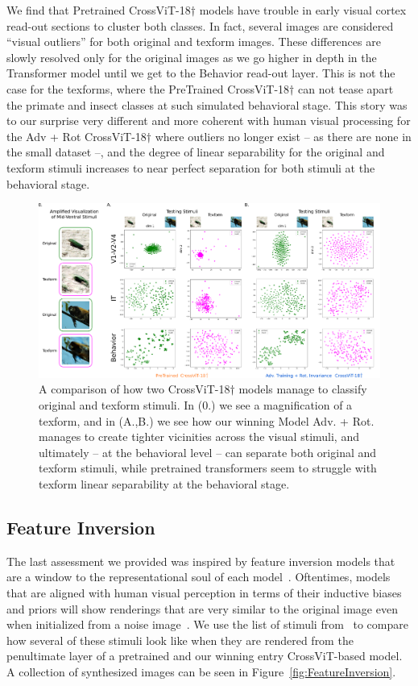 \documentclass{article} %
\begin{document}
We find that Pretrained CrossViT-18$\dagger$ models have trouble in early visual cortex read-out sections to cluster both classes. In fact, several images are considered ``visual outliers'' for both original and texform images. These differences are slowly resolved only for the original images as we go higher in depth in the Transformer model until we get to the Behavior read-out layer. This is not the case for the texforms, where the PreTrained CrossViT-18$\dagger$ can not tease apart the primate and insect classes at such simulated behavioral stage. This story was to our surprise very different and more coherent with human visual processing for the Adv + Rot CrossViT-18$\dagger$ where outliers no longer exist -- as there are none in the small dataset --, and the degree of linear separability for the original and texform stimuli increases to near perfect separation for both stimuli at the behavioral stage.

\begin{figure}[!t]\centering
\includegraphics[width=0.9\linewidth]{src/tSNE_Plots_Updated.pdf}
\caption{A comparison of how two CrossViT-18$\dagger$ models manage to classify original and texform stimuli. In (0.) we see a magnification of a texform, and in (A.,B.) we see how our winning Model Adv. + Rot. manages to create tighter vicinities across the visual stimuli, and ultimately -- at the behavioral level -- can separate both original and texform stimuli, while pretrained transformers seem to struggle with texform linear separability at the behavioral stage.}
\label{fig:Texform}
\end{figure}

\subsection{Feature Inversion}
\label{sec:Inversion}
The last assessment we provided was inspired by feature inversion models that are a window to the representational soul of each model~\citep{mahendran2015understanding}. Oftentimes, models that are aligned with human visual perception in terms of their inductive biases and priors will show renderings that are very similar to the original image even when initialized from a noise image~\citep{feather2019metamers}. We use the list of stimuli from~\cite{harrington2022finding} to compare how several of these stimuli look like when they are rendered from the penultimate layer of a pretrained and our winning entry CrossViT-based model. A collection of synthesized images can be seen in Figure~\ref{fig:FeatureInversion}.
\end{document}

